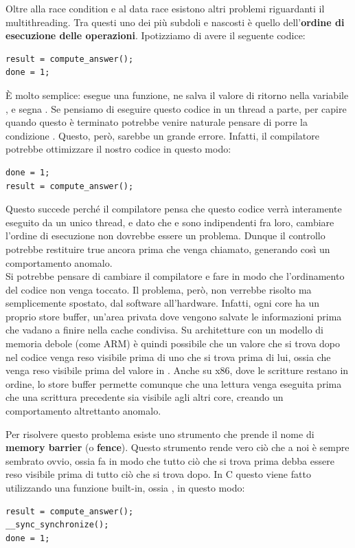 \documentclass[11pt, a4paper, titlepage, oneside]{scrbook}
\begin{document}
Oltre alla race condition e al data race esistono altri problemi riguardanti il multithreading. Tra questi uno dei più subdoli e nascosti è quello dell'\textbf{ordine di esecuzione delle operazioni}. Ipotizziamo di avere il seguente codice:
\begin{lstlisting}[style=C]
result = compute_answer();
done = 1;
\end{lstlisting}

È molto semplice: esegue una funzione, ne salva il valore di ritorno nella variabile , e segna . Se pensiamo di eseguire questo codice in un thread a parte, per capire quando questo è terminato potrebbe venire naturale pensare di porre la condizione . Questo, però, sarebbe un grande errore. Infatti, il compilatore potrebbe ottimizzare il nostro codice in questo modo:
\begin{lstlisting}[style=C]
done = 1;
result = compute_answer();
\end{lstlisting}

Questo succede perché il compilatore pensa che questo codice verrà interamente eseguito da un unico thread, e dato che  e  sono indipendenti fra loro, cambiare l'ordine di esecuzione non dovrebbe essere un problema. Dunque il controllo  potrebbe restituire true ancora prima che  venga chiamato, generando così un comportamento anomalo. \\
Si potrebbe pensare di cambiare il compilatore e fare in modo che l'ordinamento del codice non venga toccato. Il problema, però, non verrebbe risolto ma semplicemente spostato, dal software all'hardware. Infatti, ogni core ha un proprio store buffer, un'area privata dove vengono salvate le informazioni prima che vadano a finire nella cache condivisa. Su architetture con un modello di memoria debole (come ARM) è quindi possibile che un valore che si trova dopo nel codice venga reso visibile prima di uno che si trova prima di lui, ossia che  venga reso visibile prima del valore in . Anche su x86, dove le scritture restano in ordine, lo store buffer permette comunque che una lettura venga eseguita prima che una scrittura precedente sia visibile agli altri core, creando un comportamento altrettanto anomalo.  

Per risolvere questo problema esiste uno strumento che prende il nome di \textbf{memory barrier} (o \textbf{fence}). Questo strumento rende vero ciò che a noi è sempre sembrato ovvio, ossia fa in modo che tutto ciò che si trova prima debba essere reso visibile prima di tutto ciò che si trova dopo. In C questo viene fatto utilizzando una funzione built-in, ossia , in questo modo:
\begin{lstlisting}[style=C]
result = compute_answer();
__sync_synchronize();
done = 1;
\end{lstlisting}
\end{document}
